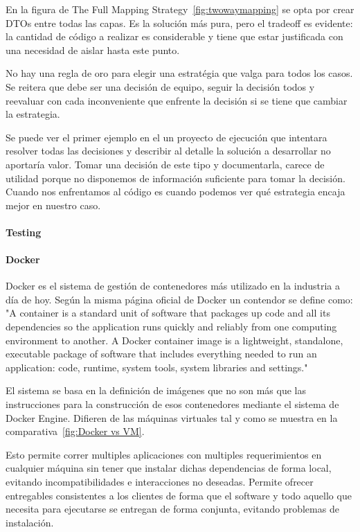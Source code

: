 En la figura de The Full Mapping Strategy~\cref{fig:twowaymapping} se opta por crear DTOs entre todas las capas. Es la solución más pura, pero el tradeoff es evidente: la cantidad de código a realizar es considerable y tiene que estar justificada con una necesidad de aislar hasta este punto.

No hay una regla de oro para elegir una estratégia que valga para todos los casos. Se reitera que debe ser una decisión de equipo, seguir la decisión todos y reevaluar con cada inconveniente que enfrente la decisión si se tiene que cambiar la estrategia.

Se puede ver el primer ejemplo en el un proyecto de ejecución que intentara resolver todas las decisiones y describir al detalle la solución a desarrollar no aportaría valor. Tomar una decisión de este tipo y documentarla, carece de utilidad porque no disponemos de información suficiente para tomar la decisión. Cuando nos enfrentamos al código es cuando podemos ver qué estrategia encaja mejor en nuestro caso.

\paragraph{Testing}
    

\paragraph{Docker}

Docker es el sistema de gestión de contenedores más utilizado en la industria a día de hoy. Según la misma página oficial de Docker un contendor se define como: "A container is a standard unit of software that packages up code and all its dependencies so the application runs quickly and reliably from one computing environment to another. A Docker container image is a lightweight, standalone, executable package of software that includes everything needed to run an application: code, runtime, system tools, system libraries and settings."~\cite{docker}

El sistema se basa en la definición de imágenes que no son más que las instrucciones para la construcción de esos contenedores mediante el sistema de Docker Engine. Difieren de las máquinas virtuales tal y como se muestra en la comparativa~\cref{fig:Docker vs VM}.

Esto permite correr multiples aplicaciones con multiples requerimientos en cualquier máquina sin tener que instalar dichas dependencias de forma local, evitando incompatibilidades e interacciones no deseadas. Permite ofrecer entregables consistentes a los clientes de forma que el software y todo aquello que necesita para ejecutarse se entregan de forma conjunta, evitando problemas de instalación.

